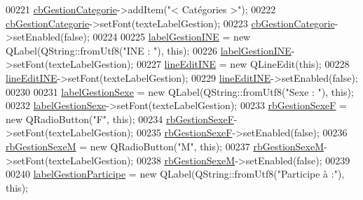 \begin{DoxyCode}
00221     \hyperlink{class_i_h_m_gestion_cross_a60cdc44c61bcd4e1e189c8de5556b89e}{cbGestionCategorie}->addItem(\textcolor{stringliteral}{"< Catégories >"});
00222     \hyperlink{class_i_h_m_gestion_cross_a60cdc44c61bcd4e1e189c8de5556b89e}{cbGestionCategorie}->setFont(texteLabelGestion);
00223     \hyperlink{class_i_h_m_gestion_cross_a60cdc44c61bcd4e1e189c8de5556b89e}{cbGestionCategorie}->setEnabled(\textcolor{keyword}{false});
00224 
00225     \hyperlink{class_i_h_m_gestion_cross_a56e8930b11c38475450df50a48d4581e}{labelGestionINE} = \textcolor{keyword}{new} QLabel(QString::fromUtf8(\textcolor{stringliteral}{"INE : "}), \textcolor{keyword}{this});
00226     \hyperlink{class_i_h_m_gestion_cross_a56e8930b11c38475450df50a48d4581e}{labelGestionINE}->setFont(texteLabelGestion);
00227     \hyperlink{class_i_h_m_gestion_cross_ab6c32fd079f81c4fa0b9ec0b4ef9bb61}{lineEditINE} = \textcolor{keyword}{new} QLineEdit(\textcolor{keyword}{this});
00228     \hyperlink{class_i_h_m_gestion_cross_ab6c32fd079f81c4fa0b9ec0b4ef9bb61}{lineEditINE}->setFont(texteLabelGestion);
00229     \hyperlink{class_i_h_m_gestion_cross_ab6c32fd079f81c4fa0b9ec0b4ef9bb61}{lineEditINE}->setEnabled(\textcolor{keyword}{false});
00230 
00231     \hyperlink{class_i_h_m_gestion_cross_a2e720e692a029a3f4f516a9ad00d2731}{labelGestionSexe} = \textcolor{keyword}{new} QLabel(QString::fromUtf8(\textcolor{stringliteral}{"Sexe : "}), \textcolor{keyword}{this});
00232     \hyperlink{class_i_h_m_gestion_cross_a2e720e692a029a3f4f516a9ad00d2731}{labelGestionSexe}->setFont(texteLabelGestion);
00233     \hyperlink{class_i_h_m_gestion_cross_a4474ef47310eb3511befdf1beaa18b56}{rbGestionSexeF} = \textcolor{keyword}{new} QRadioButton(\textcolor{stringliteral}{"F"}, \textcolor{keyword}{this});
00234     \hyperlink{class_i_h_m_gestion_cross_a4474ef47310eb3511befdf1beaa18b56}{rbGestionSexeF}->setFont(texteLabelGestion);
00235     \hyperlink{class_i_h_m_gestion_cross_a4474ef47310eb3511befdf1beaa18b56}{rbGestionSexeF}->setEnabled(\textcolor{keyword}{false});
00236     \hyperlink{class_i_h_m_gestion_cross_a7d471a7f96862dcd302f7f8cc52dfea4}{rbGestionSexeM} = \textcolor{keyword}{new} QRadioButton(\textcolor{stringliteral}{"M"}, \textcolor{keyword}{this});
00237     \hyperlink{class_i_h_m_gestion_cross_a7d471a7f96862dcd302f7f8cc52dfea4}{rbGestionSexeM}->setFont(texteLabelGestion);
00238     \hyperlink{class_i_h_m_gestion_cross_a7d471a7f96862dcd302f7f8cc52dfea4}{rbGestionSexeM}->setEnabled(\textcolor{keyword}{false});
00239 
00240     \hyperlink{class_i_h_m_gestion_cross_a0106cdcaf86997642d48dfad96a2368f}{labelGestionParticipe} = \textcolor{keyword}{new} QLabel(QString::fromUtf8(\textcolor{stringliteral}{"Participe à :"}), \textcolor{keyword}{this});

\end{DoxyCode}
